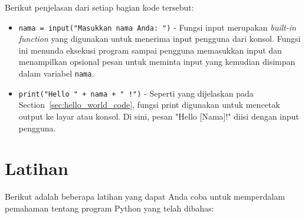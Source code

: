 Berikut penjelasan dari setiap bagian kode tersebut:

\begin{itemize}
\item \texttt{nama = input("Masukkan nama Anda: ")} - Fungsi input merupakan \textit{built-in function} yang digunakan untuk menerima input pengguna dari konsol. Fungsi ini menunda eksekusi program sampai pengguna memasukkan input dan menampilkan opsional pesan untuk meminta input yang kemudian disimpan dalam variabel \texttt{nama}.
\item \texttt{print("Hello " + nama + " !")} - Seperti yang dijelaskan pada Section~\ref{sec:hello_world_code}, fungsi print digunakan untuk mencetak output ke layar atau konsol. Di sini, pesan "Hello [Nama]!" diisi dengan input pengguna.
\end{itemize}


\section{Latihan}

Berikut adalah beberapa latihan yang dapat Anda coba untuk memperdalam pemahaman tentang program Python yang telah dibahas:

